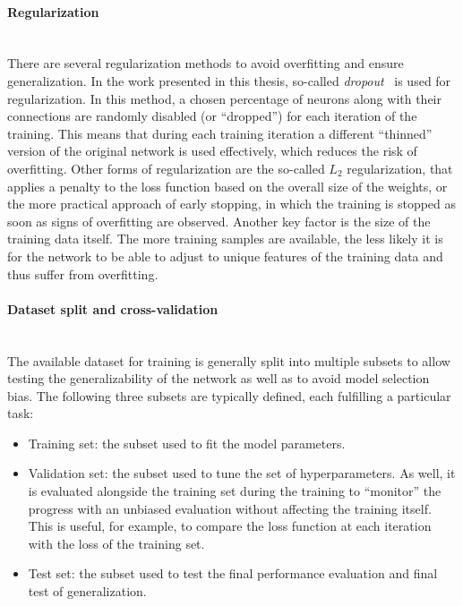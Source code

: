\paragraph{Regularization}\mbox{}\\
There are several regularization methods to avoid overfitting and ensure generalization. 
In the work presented in this thesis, so-called \emph{dropout}~\cite{srivastava_dropout_2014,DBLP:journals/corr/abs-1207-0580} is used for regularization. In this method, a chosen percentage of neurons along with their connections are randomly disabled (or ``dropped'') for each iteration of the training. This means that during each training iteration a different ``thinned'' version of the original network is used effectively, which reduces the risk of overfitting. 
Other forms of regularization are the so-called $L_2$ regularization, that applies a penalty to the loss function based on the overall size of the weights, or the more practical approach of early stopping, in which the training is stopped as soon as signs of overfitting are observed. 
Another key factor is the size of the training data itself. The more training samples are available, the less likely it is for the network to be able to adjust to unique features of the training data and thus suffer from overfitting.


\paragraph{Dataset split and cross-validation}\mbox{}\\
The available dataset for training is generally split into multiple subsets to allow testing the generalizability of the network as well as to avoid model selection bias.
The following three subsets are typically defined, each fulfilling a particular task:
\begin{itemize}
    \item Training set: the subset used to fit the model parameters.
    \item Validation set: the subset used to tune the set of hyperparameters. As well, it is evaluated alongside the training set during the training to ``monitor'' the progress with an unbiased evaluation without affecting the training itself. This is useful, for example, to compare the loss function at each iteration with the loss of the training set. 
    \item Test set: the subset used to test the final performance evaluation and final test of generalization. 
\end{itemize}

